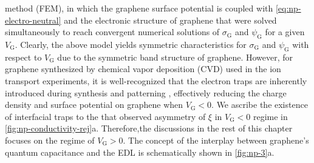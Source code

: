 method (FEM), in which the graphene surface potential is coupled with
\autoref{eq:np-electro-neutral} and the electronic structure of
graphene that were solved simultaneously to reach convergent numerical
solutions of $\sigma_{\mathrm{G}}$ and $\psi_{\mathrm{G}}$ for a given
$V_{\mathrm{G}}$. Clearly, the above model yields symmetric
characteristics for $\sigma_{\mathrm{G}}$ and $\psi_{\mathrm{G}}$ with
respect to $V_{\mathrm{G}}$ due to the symmetric band structure of
graphene.
%
However, for graphene
synthesized by chemical vapor deposition (CVD) used in the ion transport
experiments, it is well-recognized that the electron traps are
inherently introduced during synthesis and patterning
\cite{Dean_2010_BN_gr_highquality}, effectively reducing the charge
density and surface potential on graphene when $V_{\mathrm{G}}<0$.
%
We ascribe the existence of interfacial traps to the
that observed asymmetry of $\xi$ in  $V_{\mathrm{G}}<0$ regime
in \autoref{fig:np-conductivity-rej}a.
%
%
Therefore,the discussions in the rest of this chapter focuses on the
regime of $V_{\mathrm{G}}>0$. The concept of the interplay between graphene's quantum capacitance and the EDL is schematically shown in \autoref{fig:np-3}a.


